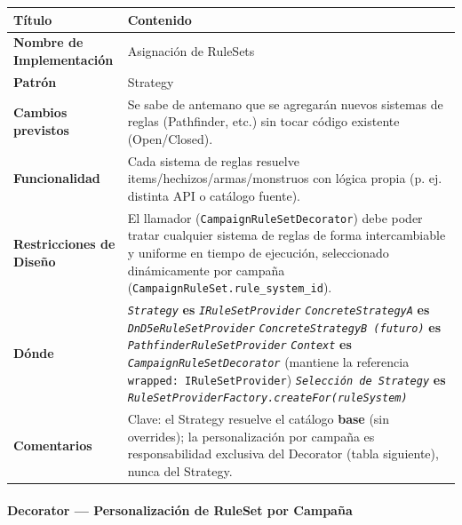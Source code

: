 {\small\setlength{\tabcolsep}{4pt}\renewcommand{\arraystretch}{1.15}
\begin{longtable}{|>{\raggedright\arraybackslash}p{3.4cm}|>{\raggedright\arraybackslash}p{11.9cm}|}
\hline
\textbf{Título} & \textbf{Contenido} \\ \hline\endhead
\textbf{Nombre de Implementación} & Asignación de RuleSets \\ \hline
\textbf{Patrón} & Strategy \\ \hline
\textbf{Cambios previstos} & Se sabe de antemano que se agregarán nuevos sistemas de reglas (Pathfinder, etc.) sin tocar código existente (Open/Closed). \\ \hline
\textbf{Funcionalidad} & Cada sistema de reglas resuelve items/hechizos/armas/monstruos con lógica propia (p. ej. distinta API o catálogo fuente). \\ \hline
\textbf{Restricciones de Diseño} & El llamador (\texttt{CampaignRuleSetDecorator}) debe poder tratar cualquier sistema de reglas de forma intercambiable y uniforme en tiempo de ejecución, seleccionado dinámicamente por campaña (\texttt{CampaignRuleSet.\allowbreak{}rule\_\allowbreak{}system\_\allowbreak{}id}). \\ \hline
\textbf{Dónde} & \textit{\texttt{Strategy}} \textbf{es} \textit{\texttt{IRuleSetProvider}} \newline{} \textit{\texttt{ConcreteStrategyA}} \textbf{es} \textit{\texttt{DnD5eRuleSetProvider}} \newline{} \textit{\texttt{ConcreteStrategyB (futuro)}} \textbf{es} \textit{\texttt{PathfinderRuleSetProvider}} \newline{} \textit{\texttt{Context}} \textbf{es} \textit{\texttt{CampaignRuleSetDecorator}} (mantiene la referencia \texttt{wrapped: IRuleSetProvider}) \newline{} \textit{\texttt{Selección de Strategy}} \textbf{es} \textit{\texttt{RuleSetProviderFactory.\allowbreak{}createFor(ruleSystem)}} \\ \hline
\textbf{Comentarios} & Clave: el Strategy resuelve el catálogo \textbf{base} (sin overrides); la personalización por campaña es responsabilidad exclusiva del Decorator (tabla siguiente), nunca del Strategy. \\ \hline
\end{longtable}}
\paragraph{Decorator — Personalización de RuleSet por Campaña}


